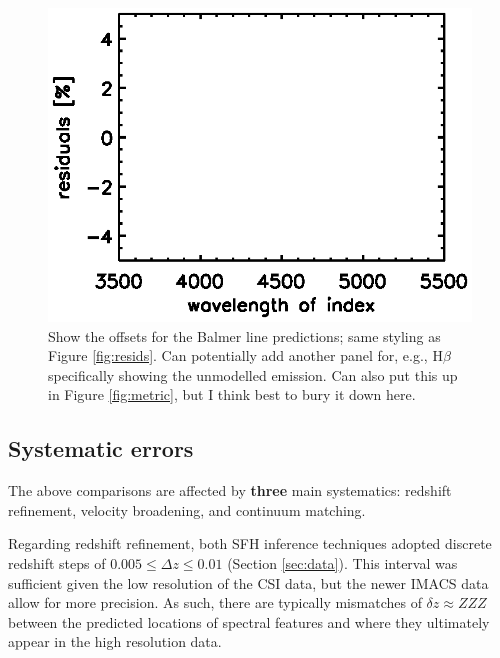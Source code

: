 \documentclass[a4paper,fleqn,usenatbib]{mnras}
\newcommand{\bfr}{\bf\color{red}}
\newcommand{\bfb}{\color{myblue}}
\begin{document}
\begin{figure}
\centering
\includegraphics[scale = 0.9, trim = 1cm 0cm 0cm 0cm]{balmer}
\caption{\bfb Show the offsets for the Balmer line predictions; same styling as Figure \ref{fig:resids}.
		Can potentially add another panel for, e.g., H$\beta$ specifically showing the unmodelled 
		emission. Can also put this up in Figure \ref{fig:metric}, but I think best to bury it down here.}
\label{fig:balmer}
\end{figure}

\subsection{Systematic errors}
\label{sec:systematics}

The above comparisons are affected by {\bfr three} main systematics: redshift refinement, 
velocity broadening,
and continuum matching. 

Regarding redshift refinement, both SFH inference techniques 
adopted discrete redshift steps of $0.005\leq\Delta z \leq 0.01$ (Section \ref{sec:data}). 
This interval was sufficient
given the low resolution of the CSI data, but the newer IMACS data allow for
more precision. As such, there are typically mismatches of 
{\bfr $\delta z \approx ZZZ$} between the predicted locations of spectral features and where they 
ultimately appear in the high resolution data.
\end{document}
